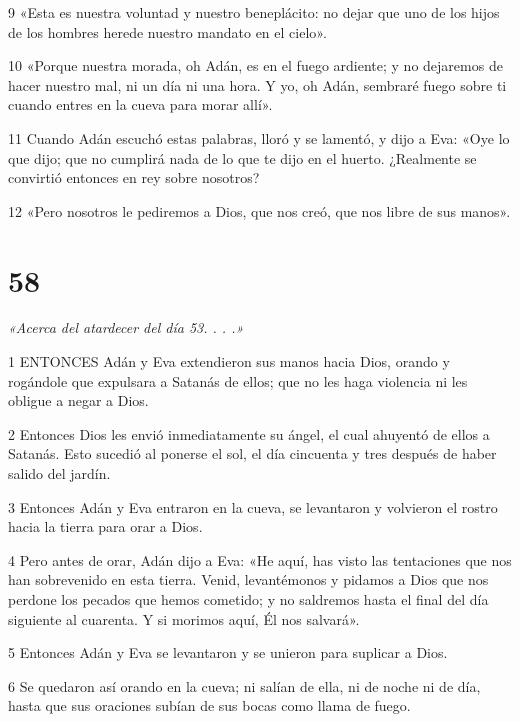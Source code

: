 \par 9 «Esta es nuestra voluntad y nuestro beneplácito: no dejar que uno de los hijos de los hombres herede nuestro mandato en el cielo».

\par 10 «Porque nuestra morada, oh Adán, es en el fuego ardiente; y no dejaremos de hacer nuestro mal, ni un día ni una hora. Y yo, oh Adán, sembraré fuego sobre ti cuando entres en la cueva para morar allí».

\par 11 Cuando Adán escuchó estas palabras, lloró y se lamentó, y dijo a Eva: «Oye lo que dijo; que no cumplirá nada de lo que te dijo en el huerto. ¿Realmente se convirtió entonces en rey sobre nosotros?

\par 12 «Pero nosotros le pediremos a Dios, que nos creó, que nos libre de sus manos».

\chapter{58}

\par \textit{«Acerca del atardecer del día 53. . . .»}

\par 1 ENTONCES Adán y Eva extendieron sus manos hacia Dios, orando y rogándole que expulsara a Satanás de ellos; que no les haga violencia ni les obligue a negar a Dios.

\par 2 Entonces Dios les envió inmediatamente su ángel, el cual ahuyentó de ellos a Satanás. Esto sucedió al ponerse el sol, el día cincuenta y tres después de haber salido del jardín.

\par 3 Entonces Adán y Eva entraron en la cueva, se levantaron y volvieron el rostro hacia la tierra para orar a Dios.

\par 4 Pero antes de orar, Adán dijo a Eva: «He aquí, has visto las tentaciones que nos han sobrevenido en esta tierra. Venid, levantémonos y pidamos a Dios que nos perdone los pecados que hemos cometido; y no saldremos hasta el final del día siguiente al cuarenta. Y si morimos aquí, Él nos salvará».

\par 5 Entonces Adán y Eva se levantaron y se unieron para suplicar a Dios.

\par 6 Se quedaron así orando en la cueva; ni salían de ella, ni de noche ni de día, hasta que sus oraciones subían de sus bocas como llama de fuego.

